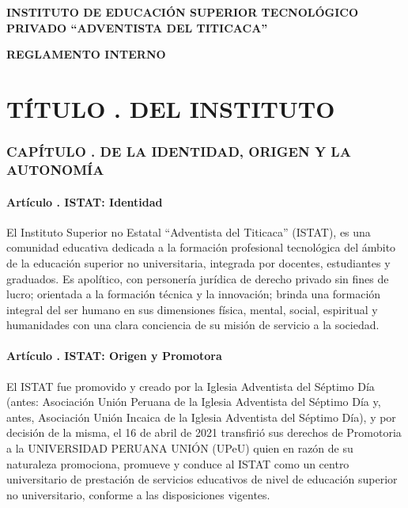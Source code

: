 
\setcounter{secnumdepth}{0}
\setcounter{tocdepth}{1}

\addtocounter{ns}{1}

\addtocounter{re}{1}
\setcounter{re}{1}

\addtocounter{su}{1}

\addtocounter{par}{1}


\newpage

\begin{center}
\textbf{\textcolor{istat}{INSTITUTO DE EDUCACIÓN SUPERIOR TECNOLÓGICO PRIVADO “ADVENTISTA DEL TITICACA”}}
\end{center}

\begin{center}
\textbf{\textcolor{istat}{REGLAMENTO INTERNO}}
\end{center}

\part{TÍTULO . DEL INSTITUTO}
\addtocounter{ns}{1}
\section{CAPÍTULO . DE LA IDENTIDAD, ORIGEN Y LA AUTONOMÍA }
\addtocounter{re}{1}
\subsection{Artículo . ISTAT: Identidad}
\addtocounter{ns}{1}
El Instituto Superior no Estatal “Adventista del Titicaca” (ISTAT), es una comunidad educativa dedicada a la formación profesional tecnológica del ámbito de la educación superior no universitaria, integrada por docentes, estudiantes y graduados. Es apolítico, con personería jurídica de derecho privado sin fines de lucro; orientada a la formación técnica y la innovación; brinda una formación integral del ser humano en sus dimensiones física, mental, social, espiritual y humanidades con una clara conciencia de su misión de servicio a la sociedad. 
\subsection{Artículo . ISTAT: Origen y Promotora}
\addtocounter{ns}{1}
El ISTAT fue promovido y creado por la Iglesia Adventista del Séptimo Día (antes: Asociación Unión Peruana de la Iglesia Adventista del Séptimo Día y, antes, Asociación Unión Incaica de la Iglesia Adventista del Séptimo Día), y por decisión de la misma, el 16 de abril de 2021 transfirió sus derechos de Promotoria a la UNIVERSIDAD PERUANA UNIÓN (UPeU) quien en razón de su naturaleza promociona, promueve y conduce al ISTAT como un centro universitario de prestación de servicios educativos de nivel de educación superior no universitario, conforme a las disposiciones vigentes.


